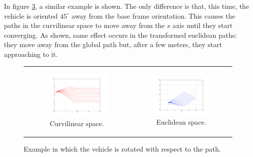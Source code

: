 In figure \ref{fig:cp07_frenet45}, a similar example is shown. The only difference is that, this time, the vehicle is oriented $45^\circ$ away from the base frame orientation. This causes the paths in the curvilinear space to move away from the $s$ axis until they start converging. As shown, same effect occurs in the transformed euclidean paths: they move away from the global path but, after a few meters, they start approaching to it.

\begin{figure}[h!]
\centering
\begin{tabular}{cc}
  \begin{subfigure}[b]{0.45\textwidth}
    \centering
    \includegraphics[width=\textwidth, trim=50 40 80 60,clip]{frenet45}
    \caption{Curvilinear space.}
    \label{fig:cp07_frenet45}
  \end{subfigure} &
  \begin{subfigure}[b]{0.45\textwidth}
    \centering
    \includegraphics[width=\textwidth, trim=50 40 80 60,clip]{cartesian45}
    \caption{Euclidean space.}
    \label{fig:cp07_cartesian45}
    \end{subfigure}
\end{tabular}
\caption{Example in which the vehicle is rotated with respect to the path.}\label{fig:cp07_frenet45}
\end{figure}

